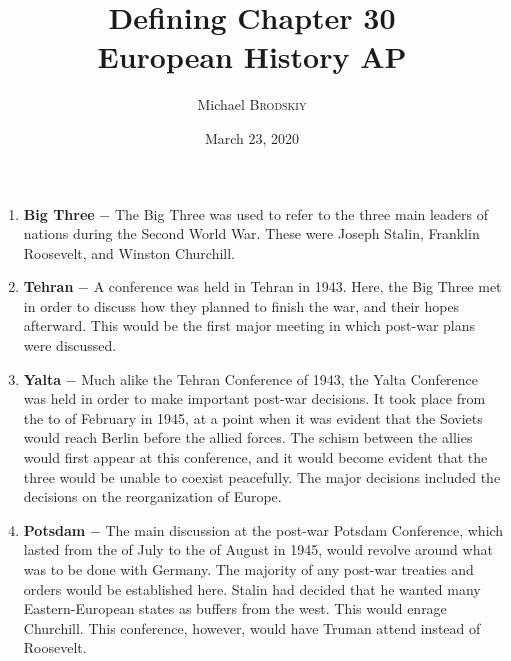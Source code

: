 \documentclass[12pt]{article}
\newcommand{\subtitle}[1]{%
  \posttitle{%
    \par\end{center}
    \begin{center}\large#1\end{center}
    \vskip0.5em}%
}
\begin{document}

\author{Michael \textsc{Brodskiy}}
\title{Defining Chapter 30 \\European History AP}
\subtitle{Mrs Fisher}
\date{March 23, 2020}
\maketitle


\begin{flushleft}
\begin{enumerate}

	\item \textbf{Big Three} $-$ The Big Three was used to refer to the three main leaders of nations during the Second World War. These were Joseph Stalin, Franklin Roosevelt, and Winston Churchill.

	\item \textbf{Tehran} $-$ A conference was held in Tehran in 1943. Here, the Big Three met in order to discuss how they planned to finish the war, and their hopes afterward. This would be the first major meeting in which post-war plans were discussed.

    \item \textbf{Yalta} $-$ Much alike the Tehran Conference of 1943, the Yalta Conference was held in order to make important post-war decisions. It took place from the  to  of February in 1945, at a point when it was evident that the Soviets would reach Berlin before the allied forces. The schism between the allies would first appear at this conference, and it would become evident that the three would be unable to coexist peacefully. The major decisions included the decisions on the reorganization of Europe.

    \item \textbf{Potsdam} $-$ The main discussion at the post-war Potsdam Conference, which lasted from the  of July to the  of August in 1945, would revolve around what was to be done with Germany. The majority of any post-war treaties and orders would be established here. Stalin had decided that he wanted many Eastern-European states as buffers from the west. This would enrage Churchill. This conference, however, would have Truman attend instead of Roosevelt.


\end{enumerate}
\end{flushleft}
\end{document}
